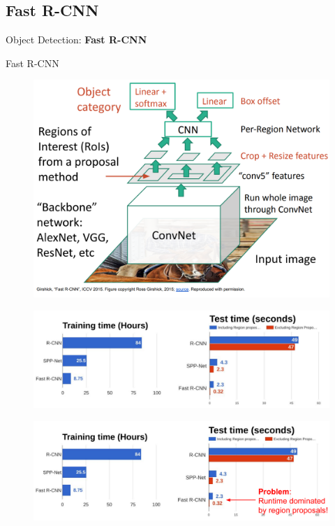 \subsection{Fast R-CNN}
\begin{frame}{}
    \LARGE Object Detection: \textbf{Fast R-CNN}
\end{frame}

\begin{frame}{Fast R-CNN}
    \begin{figure}
        \centering
        \includegraphics[width=1.0\textwidth,height=1.0\textheight,keepaspectratio]{images/object-detect/fast_rcnn_1.png}
    \end{figure}

\framebreak

    \begin{figure}
        \centering
        \includegraphics[width=1.0\textwidth,height=1.0\textheight,keepaspectratio]{images/object-detect/fast_rcnn_2.png}
    \end{figure}

\framebreak

    \begin{figure}
        \centering
        \includegraphics[width=1.0\textwidth,height=1.0\textheight,keepaspectratio]{images/object-detect/fast_rcnn_3.png}
    \end{figure}
    
\end{frame}